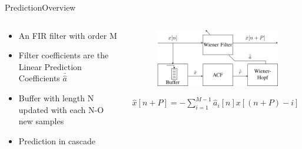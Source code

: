 \begin{frame}{Prediction}{Overview}
	\begin{columns}
		\begin{column}{0.5\textwidth}
			\begin{itemize}
				\item An FIR filter with order M
				\item Filter coefficients are the Linear Prediction Coefficients $\bar{\hat{a}}$
				\item Buffer with length N updated with each N-O new samples
				\item Prediction in cascade 
			\end{itemize}
		\end{column}
		\begin{column}{0.5\textwidth} 
			\begin{figure}
				\includegraphics[width=\textwidth]{figures/WienerHopf}
			\end{figure}
		$\hat{x}[n+P] =- \sum^{M-1}_{i=1}\hat{a}_i[n]x[(n+P)-i]$
		\end{column}
	\end{columns}
\end{frame}


